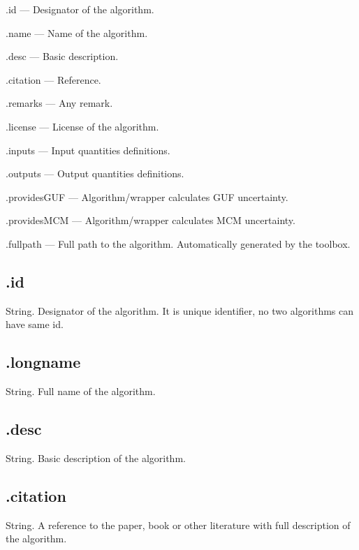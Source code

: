 \documentclass[12pt,a4paper,oneside]{report} %
\begin{document}
\begin{tightdesc}
        \item [\textsf{.id}] --- Designator of the algorithm.
        \item [\textsf{.name}] ---  Name of the algorithm.
        \item [\textsf{.desc}] ---  Basic description.
        \item [\textsf{.citation}] ---  Reference.
        \item [\textsf{.remarks}] ---  Any remark.
        \item [\textsf{.license}] ---  License of the algorithm.
        \item [\textsf{.inputs}] ---  Input quantities definitions.
        \item [\textsf{.outputs}] ---  Output quantities definitions.
        \item [\textsf{.providesGUF}] ---  Algorithm/wrapper calculates GUF uncertainty.
        \item [\textsf{.providesMCM}] ---  Algorithm/wrapper calculates MCM uncertainty.
        \item [\textsf{.fullpath}] ---  Full path to the algorithm. Automatically generated by the toolbox.
\end{tightdesc}

\subsection{\textsf{.id}} %
String. Designator of the algorithm. It is unique identifier, no two algorithms can have same id.

\subsection{\textsf{.longname}} %
String. Full name of the algorithm. 

\subsection{\textsf{.desc}} %
String. Basic description of the algorithm.

\subsection{\textsf{.citation}} %
String. A reference to the paper, book or other literature with full description of the algorithm.
\end{document}
